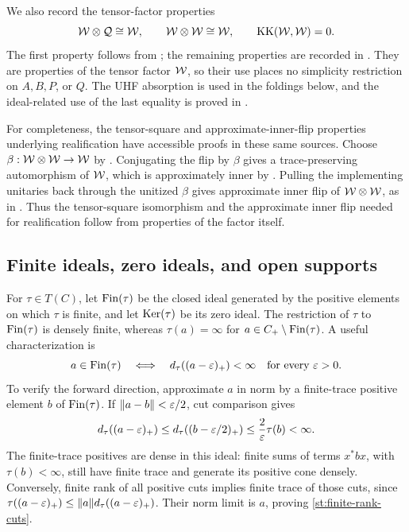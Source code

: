 We also record the tensor-factor properties
\begin{equation}\label{st:W-properties}
 \mathcal W\otimes\mathcal Q\cong\mathcal W,
 \qquad
 \mathcal W\otimes\mathcal W\cong\mathcal W,
 \qquad
 \operatorname{KK}(\mathcal W,\mathcal W)=0.
\end{equation}
The first property follows from
\cite[Proposition~6.2]{Jacelon}; the remaining properties are recorded
in \cite[Section~2.1 and Corollary~6.2]{Nawata}.
They are properties of the tensor factor \(\mathcal W\), so their use places
no simplicity restriction on \(A,B,P\), or \(Q\).
The UHF absorption is used in the foldings below, and the
ideal-related use of the last equality is proved in
.

For completeness, the tensor-square and approximate-inner-flip
properties underlying realification have accessible proofs in these
same sources. Choose $\beta:\mathcal W\otimes\mathcal W\to\mathcal W$ by
\cite[Corollary~6.2(i)]{Nawata}. Conjugating the flip by $\beta$
gives a trace-preserving automorphism of $\mathcal W$, which is approximately
inner by \cite[Corollary~4.6]{Jacelon}. Pulling the implementing
unitaries back through the unitized $\beta$ gives approximate inner
flip of $\mathcal W\otimes\mathcal W$, as in \cite[Remark~5.2]{Jacelon}.
Thus the tensor-square isomorphism and the approximate inner flip
needed for realification follow from properties of the factor itself.

\subsection{Finite ideals, zero ideals, and open supports}

For \(\tau\in T(C)\), let \(\operatorname{Fin}(\tau)\) be the closed ideal
generated by the positive elements on which \(\tau\) is finite,
and let \(\operatorname{Ker}(\tau)\) be its zero ideal. The restriction of
\(\tau\) to \(\operatorname{Fin}(\tau)\) is densely finite, whereas
\(\tau(a)=\infty\) for \(a\in C_+\setminus\operatorname{Fin}(\tau)\).
A useful characterization is
\begin{equation}\label{st:finite-rank-cuts}
 a\in\operatorname{Fin}(\tau)
 \quad\Longleftrightarrow\quad
 d_\tau((a-\varepsilon)_+)<\infty\quad\hbox{for every }\varepsilon>0.
\end{equation}
To verify the forward direction, approximate \(a\) in norm by a
finite-trace positive element \(b\) of \(\operatorname{Fin}(\tau)\).
If \(\|a-b\|<\varepsilon/2\), cut comparison gives
\[
 d_\tau((a-\varepsilon)_+)
 \leq d_\tau((b-\varepsilon/2)_+)
 \leq \frac{2}{\varepsilon}\tau(b)<\infty.
\]
The finite-trace positives are dense in this ideal: finite sums of
terms \(x^*bx\), with \(\tau(b)<\infty\), still have finite trace
and generate its positive cone densely. Conversely, finite rank of
all positive cuts implies finite trace of those cuts, since
\(\tau((a-\varepsilon)_+)\leq\|a\|d_\tau((a-\varepsilon)_+)\).
Their norm limit is \(a\), proving \eqref{st:finite-rank-cuts}.

